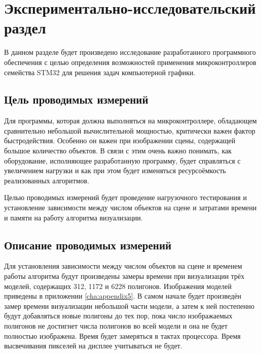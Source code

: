 \chapter{Экспериментально-исследовательский раздел}



В данном разделе будет произведено исследование разработанного программного обеспечения с целью определения возможностей применения 
микроконтроллеров семейства STM32 для решения задач компьютерной графики.

\section{Цель проводимых измерений}
Для программы, которая должна выполняться на микроконтроллере, обладающем сравнительно небольшой вычислительной мощностью, критически 
важен фактор быстродействия. Особенно он важен при изображении сцены, содержащей большое количество объектов. В связи с этим очень 
важно понимать, как оборудование, исполняющее разработанную программу, будет справляться с увеличением нагрузки и как при этом 
будет изменяться ресурсоёмкость реализованных алгоритмов.

Целью проводимых измерений будет проведение нагрузочного тестирования и установление зависимости между числом объектов на сцене и затратами 
времени и памяти на работу алгоритма визуализации.



\section{Описание проводимых измерений}
Для установления зависимости между числом объектов на сцене и временем работы алгоритма будут произведены замеры времени при 
визуализации трёх моделей, содержащих 312, 1172 и 6228 полигонов. Изображения моделей приведены в приложении \ref{cha:appendix5}. 
В самом начале будет произведён замер времени визуализации небольшой части модели, а затем к ней постепенно будут добавляться 
новые полигоны до тех пор, пока число изображаемых полигонов не достигнет числа полигонов во всей модели и она не будет 
полностью изображена. Время будет замеряться в тактах процессора. Время высвечивания пикселей на дисплее учитываться не будет.


